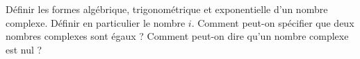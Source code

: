 %
%
	\begin{tasks}
		\task Définir les formes algébrique, trigonométrique et exponentielle d'un nombre complexe.
		\task Définir en particulier le nombre $i$.
		\task Comment peut-on spécifier que deux nombres complexes sont égaux ?
		\task Comment peut-on dire qu'un nombre complexe est nul ?
	\end{tasks}

